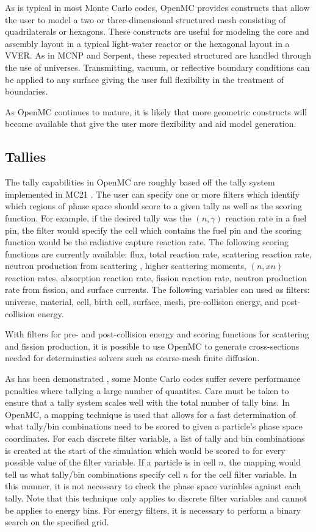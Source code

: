\documentclass{elsarticle}
\begin{document}
As is typical in most Monte Carlo codes, OpenMC provides constructs that allow
the user to model a two or three-dimensional structured mesh consisting of
quadrilaterals or hexagons. These constructs are useful for modeling the core
and assembly layout in a typical light-water reactor or the hexagonal layout in
a VVER. As in MCNP and Serpent, these repeated structured are handled through
the use of universes. Transmitting, vacuum, or reflective boundary conditions
can be applied to any surface giving the user full flexibility in the treatment
of boundaries.

As OpenMC continues to mature, it is likely that more geometric constructs will
become available that give the user more flexibility and aid model generation.

\subsection{Tallies}

The tally capabilities in OpenMC are roughly based off the tally system
implemented in MC21 \cite{MC21}. The user can specify one or more filters which
identify which regions of phase space should score to a given tally as well as
the scoring function. For example, if the desired tally was the $(n,\gamma)$
reaction rate in a fuel pin, the filter would specify the cell which contains
the fuel pin and the scoring function would be the radiative capture reaction
rate. The following scoring functions are currently available: flux, total
reaction rate, scattering reaction rate, neutron production from scattering
\cite{herman}, higher scattering moments, $(n,xn)$ reaction rates, absorption
reaction rate, fission reaction rate, neutron production rate from fission, and
surface currents. The following variables can used as filters: universe,
material, cell, birth cell, surface, mesh, pre-collision energy, and
post-collision energy.

With filters for pre- and post-collision energy and scoring functions for
scattering and fission production, it is possible to use OpenMC to generate
cross-sections needed for determinstics solvers such as coarse-mesh finite
diffusion.

As has been demonstrated \cite{mcnp-efficiency}, some Monte Carlo codes suffer
severe performance penalties where tallying a large number of quantites. Care
must be taken to ensure that a tally system scales well with the total number of
tally bins. In OpenMC, a mapping technique is used that allows for a fast
determination of what tally/bin combinations need to be scored to given a
particle's phase space coordinates. For each discrete filter variable, a list of
tally and bin combinations is created at the start of the simulation which would
be scored to for every possible value of the filter variable. If a particle is
in cell $n$, the mapping would tell us what tally/bin combinations specify cell
$n$ for the cell filter variable. In this manner, it is not necessary to check
the phase space variables against each tally. Note that this technique only
applies to discrete filter variables and cannot be applies to energy bins. For
energy filters, it is necessary to perform a binary search on the specified
grid.
\end{document}
